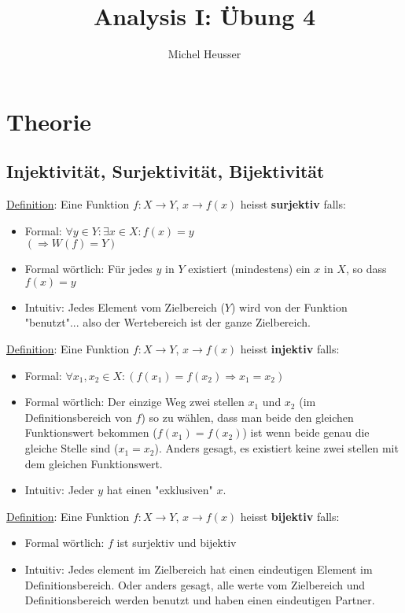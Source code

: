 \documentclass[11pt]{article} %
\title{Analysis I: Übung 4}
\author{Michel Heusser}
\begin{document}
\maketitle

\section{Theorie}

\subsection{Injektivität, Surjektivität, Bijektivität}
\underline{Definition}: Eine Funktion $f: X \rightarrow Y$, $x \rightarrow f(x)$ heisst {\bf surjektiv} falls:
\begin{itemize}  
\item Formal: $\forall y \in Y: \exists x \in X: f(x) = y$\\  $(\Rightarrow W(f) = Y)$
\item Formal wörtlich: Für jedes $y$ in $Y$ existiert (mindestens) ein $x$ in $X$, so dass $f(x) = y$
\item Intuitiv: Jedes Element vom Zielbereich ($Y$) wird von der Funktion "benutzt"... also der Wertebereich ist der ganze Zielbereich. 
\end{itemize}





\underline{Definition}: Eine Funktion $f: X \rightarrow Y$, $x \rightarrow f(x)$ heisst {\bf injektiv} falls:
\begin{itemize}  
\item Formal: $\forall x_1, x_2 \in X: (f(x_1) = f(x_2) \Rightarrow x_1 = x_2)$
\item Formal wörtlich: Der einzige Weg zwei stellen $x_1$ und $x_2$ (im Definitionsbereich von $f$) so zu wählen, dass man beide den gleichen Funktionswert bekommen ($f(x_1) = f(x_2)$) ist wenn beide genau die gleiche Stelle sind ($x_1=x_2$). Anders gesagt, es existiert keine zwei stellen mit dem gleichen Funktionswert. 
\item Intuitiv: Jeder $y$ hat einen "exklusiven" $x$.
\end{itemize}


\underline{Definition}: Eine Funktion $f: X \rightarrow Y$, $x \rightarrow f(x)$ heisst {\bf bijektiv} falls:
\begin{itemize}  
\item Formal wörtlich: $f$ ist surjektiv und bijektiv
\item Intuitiv: Jedes element im Zielbereich hat einen eindeutigen Element im Definitionsbereich. Oder anders gesagt, alle werte vom Zielbereich und Definitionsbereich werden benutzt und haben einen eindeutigen Partner.
\end{itemize}
\end{document}
